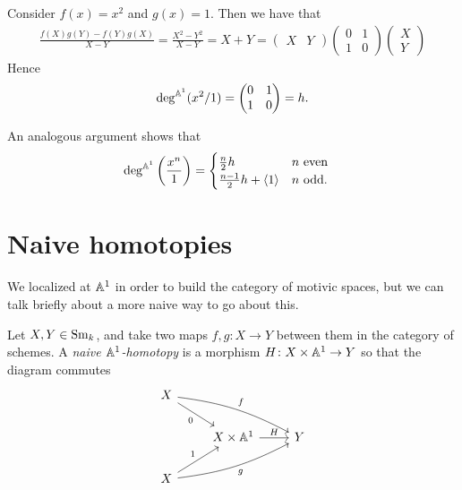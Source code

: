 \documentclass[11pt,openany]{book}
\begin{document}
\begin{example} Consider $f(x) = x^2$ and $g(x) = 1$. Then we have that
\begin{align*}
    \frac{f(X)g(Y) -f(Y)g(X)}{X-Y} = \frac{X^2 - Y^2}{X-Y} = X + Y = \begin{pmatrix} X & Y \end{pmatrix} \begin{pmatrix} 0 & 1 \\ 1 & 0 \end{pmatrix} \begin{pmatrix} X \\ Y \end{pmatrix} 
\end{align*}
Hence
\begin{align*}
    \deg^{\mathbb{A}^1}(x^2/1) = \begin{pmatrix} 0 & 1 \\ 1 & 0 \end{pmatrix} = h.
\end{align*}
\end{example}

\begin{corollary} An analogous argument shows that
\begin{align*}
    \deg^{\mathbb{A}^1} \left( \frac{x^n}{1} \right) &= \begin{cases} \frac{n}{2}h & n\text{ even} \\ \frac{n-1}{2}h + \left\langle 1 \right\rangle & n\text{ odd.} \end{cases}
\end{align*}
\end{corollary}

\section{Naive homotopies}

We localized at $\mathbb{A}^1$ in order to build the category of motivic spaces, but we can talk briefly about a more naive way to go about this.

\begin{definition} Let $X,Y \in \mathrm{Sm}_k$, and take two maps $f,g \colon X \to Y$ between them in the category of schemes. A \textit{naive $\mathbb{A}^1$-homotopy} is a morphism $H \colon X \times \mathbb{A}^1 \to Y$ so that the diagram commutes
\[\begin{tikzcd}
    X\ar[drr,"f" above right, bend left=10]\ar[dr,"0" below left] &  & \\
     & X \times \A^1\rar["H"] & Y\\
    X\ar[urr,"g" below right,bend right=10]\ar[ur,"1"] &  & 
\end{tikzcd} \]
\end{definition}
\end{document}
